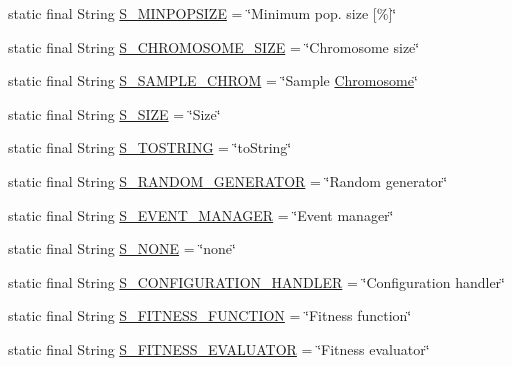 \begin{DoxyCompactItemize}
\item 
static final String \hyperlink{classorg_1_1jgap_1_1_configuration_ae339d3a453ba82ed8b85e8493e16a8ad}{S\-\_\-\-M\-I\-N\-P\-O\-P\-S\-I\-Z\-E} = \char`\"{}Minimum pop. size \mbox{[}\%\mbox{]}\char`\"{}
\item 
static final String \hyperlink{classorg_1_1jgap_1_1_configuration_aef9249c172571664f5eada2b87580853}{S\-\_\-\-C\-H\-R\-O\-M\-O\-S\-O\-M\-E\-\_\-\-S\-I\-Z\-E} = \char`\"{}Chromosome size\char`\"{}
\item 
static final String \hyperlink{classorg_1_1jgap_1_1_configuration_aff569b9cf58f24a5ba5c817936bd8eaf}{S\-\_\-\-S\-A\-M\-P\-L\-E\-\_\-\-C\-H\-R\-O\-M} = \char`\"{}Sample \hyperlink{classorg_1_1jgap_1_1_chromosome}{Chromosome}\char`\"{}
\item 
static final String \hyperlink{classorg_1_1jgap_1_1_configuration_aee9a01fe1f940cba39fdf7e884215541}{S\-\_\-\-S\-I\-Z\-E} = \char`\"{}Size\char`\"{}
\item 
static final String \hyperlink{classorg_1_1jgap_1_1_configuration_ad1d7b5af8796e7bbe8995287ce3beb8d}{S\-\_\-\-T\-O\-S\-T\-R\-I\-N\-G} = \char`\"{}to\-String\char`\"{}
\item 
static final String \hyperlink{classorg_1_1jgap_1_1_configuration_a5a5f7c88c3f255a3a79d3d761e0b74a9}{S\-\_\-\-R\-A\-N\-D\-O\-M\-\_\-\-G\-E\-N\-E\-R\-A\-T\-O\-R} = \char`\"{}Random generator\char`\"{}
\item 
static final String \hyperlink{classorg_1_1jgap_1_1_configuration_a8283161a07fe963e449e918d482bfc77}{S\-\_\-\-E\-V\-E\-N\-T\-\_\-\-M\-A\-N\-A\-G\-E\-R} = \char`\"{}Event manager\char`\"{}
\item 
static final String \hyperlink{classorg_1_1jgap_1_1_configuration_a546ab1eed8429a6bdcdfcfceb6e4d342}{S\-\_\-\-N\-O\-N\-E} = \char`\"{}none\char`\"{}
\item 
static final String \hyperlink{classorg_1_1jgap_1_1_configuration_a64ed6008cbf8376c630d5d9e14b8b951}{S\-\_\-\-C\-O\-N\-F\-I\-G\-U\-R\-A\-T\-I\-O\-N\-\_\-\-H\-A\-N\-D\-L\-E\-R} = \char`\"{}Configuration handler\char`\"{}
\item 
static final String \hyperlink{classorg_1_1jgap_1_1_configuration_a29a46661270aa65be2eceb435e319043}{S\-\_\-\-F\-I\-T\-N\-E\-S\-S\-\_\-\-F\-U\-N\-C\-T\-I\-O\-N} = \char`\"{}Fitness function\char`\"{}
\item 
static final String \hyperlink{classorg_1_1jgap_1_1_configuration_a996ac849b7d29cea50f91e21a37a84c6}{S\-\_\-\-F\-I\-T\-N\-E\-S\-S\-\_\-\-E\-V\-A\-L\-U\-A\-T\-O\-R} = \char`\"{}Fitness evaluator\char`\"{}

\end{DoxyCompactItemize}
